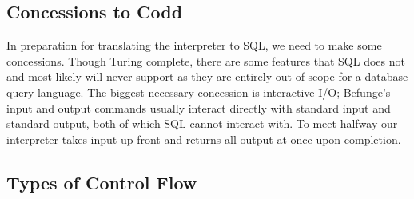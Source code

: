 \documentclass[sigconf,nonacm,screen,review,balance=false]{acmart}
\begin{document}
\subsection{Concessions to Codd}

In preparation for translating the interpreter to SQL, we need to make some
concessions. Though Turing complete, there are some features that SQL does not
and most likely will never support as they are entirely out of scope for a
database query language. The biggest necessary concession is interactive I/O;
Befunge's input and output commands usually interact directly with standard
input and standard output, both of which SQL cannot interact with. To meet
halfway our interpreter takes input up-front and returns all output at once
upon completion.


\subsection{Types of Control Flow}
\label{sec:cf-types}
\end{document}
